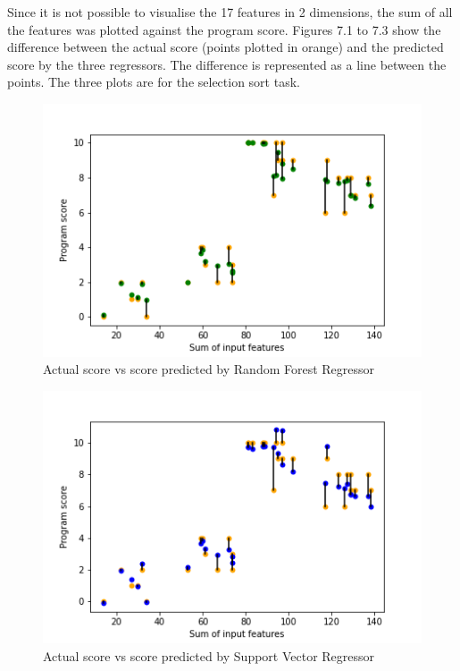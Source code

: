Since it is not possible to visualise the 17 features in 2 dimensions,
the sum of all the features was plotted against the program score.
Figures 7.1 to 7.3 show the difference between the actual score (points
plotted in orange) and the predicted score by the three
regressors. The difference is represented as a line between the
points. The three plots are for the selection sort task.

\begin{figure}[H]
\centering
\includegraphics[scale=1.0]{./figures/ss_rf.png}
\caption{Actual score vs score predicted by Random Forest Regressor}
\label{fig_rf}
\end{figure}

\begin{figure}[H]
\centering
\includegraphics[scale=1.0]{./figures/ss_svr.png}
\caption{Actual score vs score predicted by Support Vector Regressor}
\label{fig_rf}
\end{figure}

